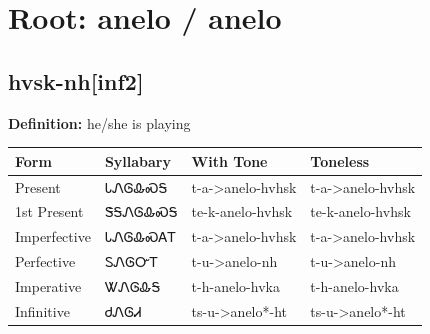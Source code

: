\documentclass{article}%
\begin{document}
%
\normalsize%
\section*{Root: anelo / anelo}%
\subsection*{hvsk-nh[inf2]}%
\textbf{Definition: }%
he/she is playing%
\\[0.5em]%
\begin{tabular}{|l|l|l|l|}%
\hline%
\textbf{Form}&\textbf{Syllabary}&\textbf{With Tone}&\textbf{Toneless}\\%
\hline%
Present&ᏓᏁᎶᎲᏍᎦ&t{-}a{-}>anelo{-}hvhsk&t{-}a{-}>anelo{-}hvhsk\\%
1st Present&ᏕᎦᏁᎶᎲᏍᎦ&te{-}k{-}anelo{-}hvhsk&te{-}k{-}anelo{-}hvhsk\\%
Imperfective&ᏓᏁᎶᎲᏍᎪᎢ&t{-}a{-}>anelo{-}hvhsk&t{-}a{-}>anelo{-}hvhsk\\%
Perfective&ᏚᏁᎶᏅᎢ&t{-}u{-}>anelo{-}nh&t{-}u{-}>anelo{-}nh\\%
Imperative&ᏔᏁᎶᎲᎦ&t{-}h{-}anelo{-}hvka&t{-}h{-}anelo{-}hvka\\%
Infinitive&ᏧᏁᎶᏗ&ts{-}u{-}>anelo*{-}ht&ts{-}u{-}>anelo*{-}ht\\%
\hline%
\end{tabular}%
\\[1em]%
\end{document}
